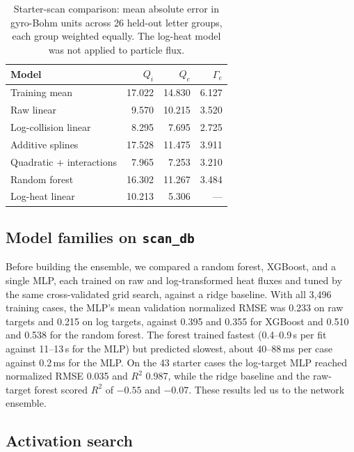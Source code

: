 \documentclass[12pt,letterpaper]{article}
\begin{document}
\begin{table}[H]
  \centering
  \small
  \begin{tabular}{lrrr}
    \toprule
    Model & $Q_i$ & $Q_e$ & $\Gamma_e$ \\
    \midrule
    Training mean & 17.022 & 14.830 & 6.127 \\
    Raw linear & 9.570 & 10.215 & 3.520 \\
    Log-collision linear & 8.295 & 7.695 & 2.725 \\
    Additive splines & 17.528 & 11.475 & 3.911 \\
    Quadratic + interactions & 7.965 & 7.253 & 3.210 \\
    Random forest & 16.302 & 11.267 & 3.484 \\
    Log-heat linear & 10.213 & 5.306 & --- \\
    \bottomrule
  \end{tabular}
  \caption{Starter-scan comparison: mean absolute error in gyro-Bohm units across 26
    held-out letter groups, each group weighted equally. The log-heat model was not
    applied to particle flux.}
  \label{tab:starter}
\end{table}

\subsection{Model families on \texttt{scan\_db}}
\label{app:family}

Before building the ensemble, we compared a random forest, XGBoost, and a single MLP, each
trained on raw and log-transformed heat fluxes and tuned by the same cross-validated grid
search, against a ridge baseline. With all 3,496 training cases, the MLP's mean validation
normalized RMSE was 0.233 on raw targets and 0.215 on log targets, against 0.395 and 0.355
for XGBoost and 0.510 and 0.538 for the random forest. The forest trained fastest (0.4--0.9\,s
per fit against 11--13\,s for the MLP) but predicted slowest, about 40--88\,ms per case
against 0.2\,ms for the MLP. On the 43 starter cases the log-target MLP reached normalized
RMSE 0.035 and $R^2$ 0.987, while the ridge baseline and the raw-target forest scored $R^2$ of
$-0.55$ and $-0.07$. These results led us to the network ensemble.

\subsection{Activation search}
\label{app:activation}
\end{document}
